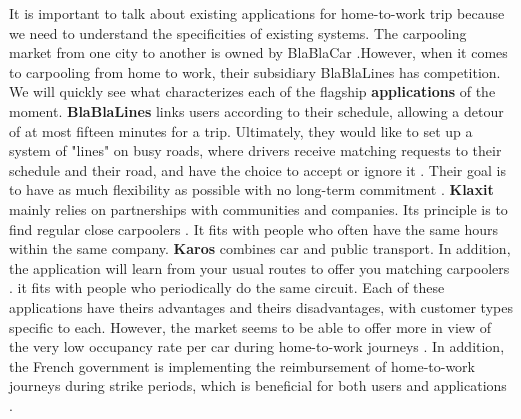\documentclass[12pt, a4paper, twoside]{memoir}
\newcommand{\newpar}{\vskip 0.2in \noindent}
\begin{document}
	It is important to talk about existing applications for home-to-work trip because we need to understand the specificities of existing systems.\newline
	The carpooling market from one city to another is owned by BlaBlaCar \cite{dionneblablacar2018}.However, when it comes to carpooling from home to work, their subsidiary BlaBlaLines has competition. We will quickly see what characterizes each of the flagship \textbf{applications} of the moment.
	\newpar
	\textbf{BlaBlaLines} links users according to their schedule, allowing a detour of at most fifteen minutes for a trip. Ultimately, they would like to set up a system of "lines" on busy roads, where drivers receive matching requests to their schedule and their road, and have the choice to accept or ignore it \cite{noauthorblablalines2017}. Their goal is to have as much flexibility as possible with no long-term commitment .
	\newpar
	\textbf{Klaxit} mainly relies on partnerships with communities and companies. Its principle is to find regular close carpoolers \cite{ARNULFKlaxit2018}. It fits with people who often have the same hours within the same company.
	\newpar
	\textbf{Karos} combines car and public transport. In addition, the application will learn from your usual routes to offer you matching carpoolers \cite{noauthorkaros2016}.
it fits with people who periodically do the same circuit.
	\newpar
	Each of these applications have theirs advantages and theirs disadvantages, with customer types specific to each. However, the market seems to be able to offer more in view of the very low occupancy rate per car during home-to-work journeys \cite{noauthoroccupancy2008}. \newline
	In addition, the French government is implementing the reimbursement of home-to-work journeys during strike periods, which is beneficial for both users and applications \cite{noauthorgreve2018}.
	
\end{document}
